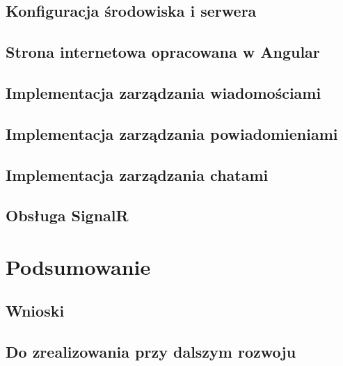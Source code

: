 \documentclass[12pt,a4paper]{article}
\begin{document}
\subsection{Konfiguracja środowiska i serwera}

\subsection{Strona internetowa opracowana w Angular}
\subsection{Implementacja zarządzania wiadomościami}
\subsection{Implementacja zarządzania powiadomieniami}
\subsection{Implementacja zarządzania chatami}
\subsection{Obsługa SignalR}

\section{Podsumowanie}

\subsection{Wnioski}
\subsection{Do zrealizowania przy dalszym rozwoju}
\end{document}
